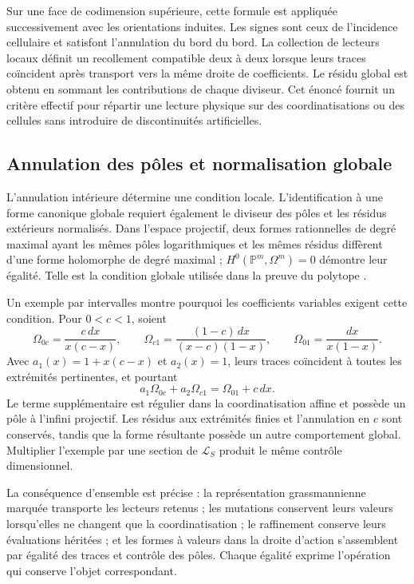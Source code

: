 Sur une face de codimension supérieure, cette formule est appliquée successivement avec les orientations induites. Les signes sont ceux de l'incidence cellulaire et satisfont l'annulation du bord du bord. La collection de lecteurs locaux définit un recollement compatible deux à deux lorsque leurs traces coïncident après transport vers la même droite de coefficients. Le résidu global est obtenu en sommant les contributions de chaque diviseur. Cet énoncé fournit un critère effectif pour répartir une lecture physique sur des coordinatisations ou des cellules sans introduire de discontinuités artificielles.

\subsection{Annulation des pôles et normalisation globale}

L'annulation intérieure détermine une condition locale. L'identification à une forme canonique globale requiert également le diviseur des pôles et les résidus extérieurs normalisés. Dans l'espace projectif, deux formes rationnelles de degré maximal ayant les mêmes pôles logarithmiques et les mêmes résidus diffèrent d'une forme holomorphe de degré maximal ; \(H^0(\mathbb P^m,\Omega^m)=0\) démontre leur égalité. Telle est la condition globale utilisée dans la preuve du polytope \cite{positive}.

Un exemple par intervalles montre pourquoi les coefficients variables
exigent cette condition. Pour \(0<c<1\), soient
\[
 \Omega_{0c}=\frac{c\,dx}{x(c-x)},\qquad
 \Omega_{c1}=\frac{(1-c)\,dx}{(x-c)(1-x)},\qquad
 \Omega_{01}=\frac{dx}{x(1-x)}.
\]
Avec \(a_1(x)=1+x(c-x)\) et \(a_2(x)=1\), leurs traces coïncident
à toutes les extrémités pertinentes, et pourtant
\[
 a_1\Omega_{0c}+a_2\Omega_{c1}=\Omega_{01}+c\,dx.
\]
Le terme supplémentaire est régulier dans la coordinatisation affine et possède un pôle à l'infini projectif. Les résidus aux extrémités finies et l'annulation en \(c\) sont conservés, tandis que la forme résultante possède un autre comportement global. Multiplier l'exemple par une section de \(\mathcal L_S\) produit le même contrôle dimensionnel.

La conséquence d'ensemble est précise : la représentation grassmannienne marquée transporte les lecteurs retenus ; les mutations conservent leurs valeurs lorsqu'elles ne changent que la coordinatisation ; le raffinement conserve leurs évaluations héritées ; et les formes à valeurs dans la droite d'action s'assemblent par égalité des traces et contrôle des pôles. Chaque égalité exprime l'opération qui conserve l'objet correspondant.
